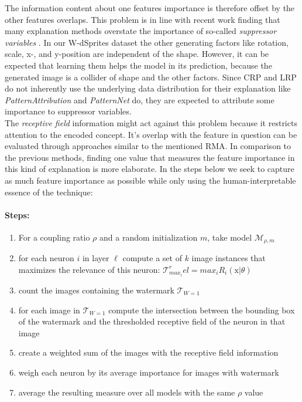 {The information content about one features importance is therefore offset by the other features overlaps. This problem is in line with recent work finding that many explanation methods overstate the importance of so-called \textit{suppressor variables} \cite{Wilming2023,Clark2023}. In our W-dSprites dataset the other generating factors like rotation, scale, x-, and y-position are independent of the shape. However, it can be expected that learning them helps the model in its prediction, because the generated image is a collider of shape and the other factors. Since CRP and LRP do not inherently use the underlying data distribution for their explanation like \textit{PatternAttribution} and \textit{PatternNet} do, they are expected to attribute some importance to suppressor variables. \\

The \textit{receptive field} information might act against this problem because it restricts attention to the encoded concept. It's overlap with the feature in question can be evaluated through approaches similar to the mentioned RMA. 
In comparison to the previous methods, finding one value that measures the feature importance in this kind of explanation is more elaborate. In the steps below we seek to capture as much feature importance as possible while only using the human-interpretable essence of the technique:

\paragraph{Steps:}
\begin{enumerate}
    \item For a coupling ratio $\rho$ and a random initialization $m$, take model $\mathcal{M}_{\rho, m}$
    \item for each neuron $i$ in layer $\ell$ compute a set of $k$ image instances that maximizes the relevance of this neuron: $\mathcal{T}_{max_i}^rel = max_i R_i(\mathrm{x} | \theta)$ 
    \item count the images containing the watermark $\mathcal{T}_{W=1}$
    \item for each image in $\mathcal{T}_{W=1}$ compute the intersection between the bounding box of the watermark and the thresholded receptive field of the neuron in that image
    \item create a weighted sum of the images with the receptive field information
    \item weigh each neuron by its average importance for images with watermark
    \item average the resulting measure over all models with the same $\rho$ value 
\end{enumerate}}


